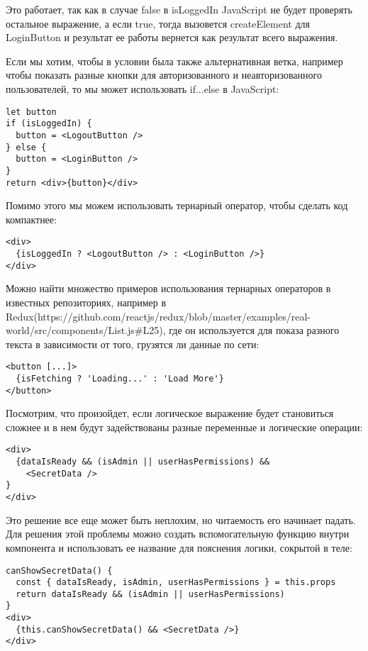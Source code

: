 Это работает, так как в случае false в isLoggedIn JavaScript не будет проверять остальное выражение, а если true, тогда вызовется createElement для LoginButton и результат ее работы вернется как результат всего выражения.

Если мы хотим, чтобы в условии была также альтернативная ветка, например чтобы показать разные кнопки для авторизованного и неавторизованного пользователей, то мы может использовать if...else в JavaScript:

\begin{lstlisting}
let button
if (isLoggedIn) {
  button = <LogoutButton />
} else {
  button = <LoginButton />
}
return <div>{button}</div>
\end{lstlisting}
   
Помимо этого мы можем использовать тернарный оператор, чтобы сделать код компактнее:

\begin{lstlisting}
<div>
  {isLoggedIn ? <LogoutButton /> : <LoginButton />}
</div>
\end{lstlisting}

Можно найти множество примеров использования тернарных операторов в известных репозиториях, например в Redux(https://github.com/reactjs/redux/blob/master/examples/real-world/src/components/List.js\#L25), где он используется для показа разного текста в зависимости от того, грузятся ли данные по сети:

\begin{lstlisting}
<button [...]>
  {isFetching ? 'Loading...' : 'Load More'}
</button>
\end{lstlisting}

Посмотрим, что произойдет, если логическое выражение будет становиться сложнее и в нем будут задействованы разные переменные и логические операции:

\begin{lstlisting}
<div>
  {dataIsReady && (isAdmin || userHasPermissions) && 
    <SecretData />
}
</div>
\end{lstlisting}

Это решение все еще может быть неплохим, но читаемость его начинает падать. Для решения этой проблемы можно создать вспомогательную функцию внутри компонента и использовать ее название для пояснения логики, сокрытой в теле:

\begin{lstlisting}
canShowSecretData() {
  const { dataIsReady, isAdmin, userHasPermissions } = this.props
  return dataIsReady && (isAdmin || userHasPermissions)
}
<div>
  {this.canShowSecretData() && <SecretData />}
</div>
\end{lstlisting}

